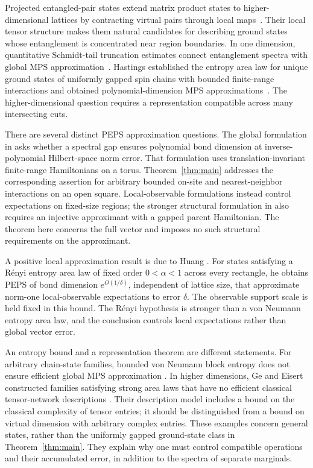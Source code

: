 Projected entangled-pair states extend matrix product states to
higher-dimensional lattices by contracting virtual pairs through local
maps~\cite{VerstraeteCirac2004PEPS}. Their local tensor structure makes them
natural candidates for describing ground states whose entanglement is
concentrated near region boundaries. In one dimension, quantitative
Schmidt-tail truncation estimates connect entanglement spectra with global
MPS approximation~\cite{VerstraeteCirac2006MPS}. Hastings established the
entropy area law for unique ground states of uniformly gapped spin chains
with bounded finite-range interactions and obtained polynomial-dimension
MPS approximations~\cite{Hastings2007}. The higher-dimensional question
requires a representation compatible across many intersecting cuts.

There are several distinct PEPS approximation questions. The global
formulation in \cite[Section~2.2, Questions~7--8]{CiracGarreRubioPerezGarcia2019}
asks whether a spectral gap ensures polynomial bond dimension at
inverse-polynomial Hilbert-space norm error. That formulation uses
translation-invariant finite-range Hamiltonians on a torus.
Theorem~\ref{thm:main} addresses the corresponding assertion for arbitrary
bounded on-site and nearest-neighbor interactions on an open square.
Local-observable formulations instead control expectations on fixed-size
regions; the stronger structural formulation in
\cite[Conjecture~2]{SchwarzBuerschaperEisert2017} also requires an injective
approximant with a gapped parent Hamiltonian. The theorem here concerns the
full vector and imposes no such structural requirements on the approximant.

A positive local approximation result is due to Huang
\cite[Theorem~3]{Huang2026Local}. For states satisfying a R\'enyi entropy
area law of fixed order $0<\alpha<1$ across every rectangle, he obtains
PEPS of bond dimension $e^{O(1/\delta)}$, independent of lattice size,
that approximate norm-one local-observable expectations to error $\delta$.
The observable support scale is held fixed in this bound. The R\'enyi
hypothesis is stronger than a von Neumann entropy area law, and the
conclusion controls local expectations rather than global vector error.

An entropy bound and a representation theorem are different statements.
For arbitrary chain-state families, bounded von Neumann block entropy
does not ensure efficient global MPS approximation
\cite{SchuchWolfVerstraeteCirac2008}. In higher dimensions, Ge and Eisert
constructed families satisfying strong area laws that have no efficient
classical tensor-network descriptions
\cite[Definition~7 and Corollary~9]{GeEisert2016}. Their description model
includes a bound on the classical complexity of tensor entries; it should
be distinguished from a bound on virtual dimension with arbitrary complex
entries. These examples concern general states, rather than the uniformly
gapped ground-state class in Theorem~\ref{thm:main}. They explain why one
must control compatible operations and their accumulated error, in addition
to the spectra of separate marginals.

